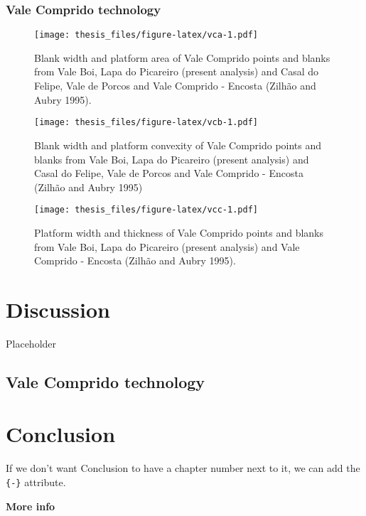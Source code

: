 \documentclass[12pt,twoside]{reedthesis}
\begin{document}
\hypertarget{vale-comprido-technology}{%
\subsection{Vale Comprido technology}\label{vale-comprido-technology}}
\begin{figure}
\centering
\texttt{[image: thesis\_files/figure-latex/vca-1.pdf]}
\caption{\label{fig:vca}Blank width and platform area of Vale Comprido points and blanks from Vale Boi, Lapa do Picareiro (present analysis) and Casal do Felipe, Vale de Porcos and Vale Comprido - Encosta (Zilhão and Aubry 1995).}
\end{figure}
\begin{figure}
\centering
\texttt{[image: thesis\_files/figure-latex/vcb-1.pdf]}
\caption{\label{fig:vcb}Blank width and platform convexity of Vale Comprido points and blanks from Vale Boi, Lapa do Picareiro (present analysis) and Casal do Felipe, Vale de Porcos and Vale Comprido - Encosta (Zilhão and Aubry 1995)}
\end{figure}
\begin{figure}
\centering
\texttt{[image: thesis\_files/figure-latex/vcc-1.pdf]}
\caption{\label{fig:vcc}Platform width and thickness of Vale Comprido points and blanks from Vale Boi, Lapa do Picareiro (present analysis) and Vale Comprido - Encosta (Zilhão and Aubry 1995).}
\end{figure}
\hypertarget{discussion}{%
\chapter{Discussion}\label{discussion}}

Placeholder

\hypertarget{vale-comprido-technology-1}{%
\section{Vale Comprido technology}\label{vale-comprido-technology-1}}

\hypertarget{conclusion}{%
\chapter*{Conclusion}\label{conclusion}}

If we don't want Conclusion to have a chapter number next to it, we can add the \texttt{\{-\}} attribute.

\textbf{More info}
\end{document}
